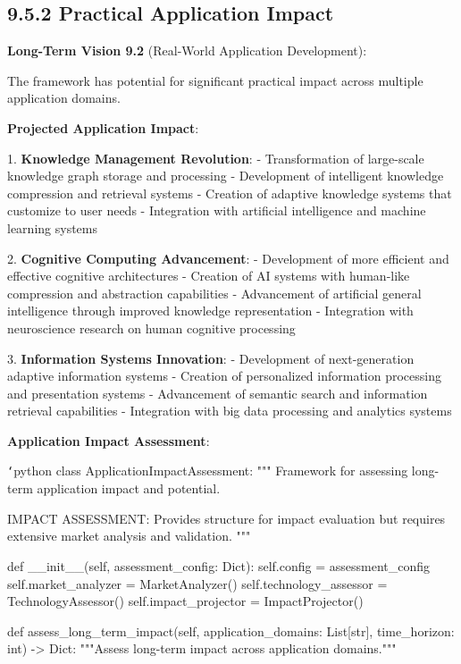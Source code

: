 \subsection{9.5.2 Practical Application Impact}

\textbf{Long-Term Vision 9.2} (Real-World Application Development):

The framework has potential for significant practical impact across multiple application domains.

\textbf{Projected Application Impact}:

1. \textbf{Knowledge Management Revolution}:
   - Transformation of large-scale knowledge graph storage and processing
   - Development of intelligent knowledge compression and retrieval systems
   - Creation of adaptive knowledge systems that customize to user needs
   - Integration with artificial intelligence and machine learning systems

2. \textbf{Cognitive Computing Advancement}:
   - Development of more efficient and effective cognitive architectures
   - Creation of AI systems with human-like compression and abstraction capabilities
   - Advancement of artificial general intelligence through improved knowledge representation
   - Integration with neuroscience research on human cognitive processing

3. \textbf{Information Systems Innovation}:
   - Development of next-generation adaptive information systems
   - Creation of personalized information processing and presentation systems
   - Advancement of semantic search and information retrieval capabilities
   - Integration with big data processing and analytics systems

\textbf{Application Impact Assessment}:

\texttt{`}python
class ApplicationImpactAssessment:
    """
    Framework for assessing long-term application impact and potential.
    
    IMPACT ASSESSMENT: Provides structure for impact evaluation
    but requires extensive market analysis and validation.
    """
    
    def __init__(self, assessment_config: Dict):
        self.config = assessment_config
        self.market_analyzer = MarketAnalyzer()
        self.technology_assessor = TechnologyAssessor()
        self.impact_projector = ImpactProjector()
        
    def assess_long_term_impact(self, application_domains: List[str], 
                               time_horizon: int) -> Dict:
        """Assess long-term impact across application domains."""
        
